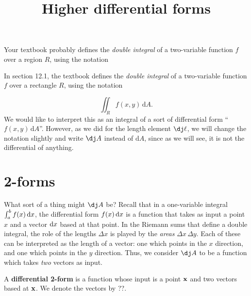 \documentclass[12pt]{amsart}
\title{Higher differential forms}
\begin{document}
\maketitle

\begin{notextbook}
  Your textbook probably defines the \emph{double integral} of a two-variable function $f$ over a region $R$, using the notation
\end{notextbook}
\begin{stewart}
  In section 12.1, the textbook defines the \emph{double integral} of a two-variable function $f$ over a rectangle $R$, using the notation
\end{stewart}
\[ \iint_R f(x,y) \,\mathrm{d}A. \]
We would like to interpret this as an integral of a sort of differential form ``$f(x,y) \,\mathrm{d}A$''.
However, as we did for the length element $\dl$, we will change the notation slightly and write $\dA$ instead of $\mathrm{d}A$, since as we will see, it is not the differential of anything.

\section{2-forms}
\label{sec:2-forms}

What sort of a thing might $\dA$ be?
Recall that in a one-variable integral $\int_a^b f(x)\,{\mathrm{d} x}$, the differential form $f(x)\,{\mathrm{d} x}$ is a function that takes as input a point $x$ and a vector ${\mathrm{d} x}$ based at that point.
In the Riemann sums that define a double integral, the role of the lengths $\Delta x$ is played by the \emph{areas} $\Delta x \,\Delta y$.
Each of these can be interpreted as the length of a vector: one which points in the $x$ direction, and one which points in the $y$ direction.
Thus, we consider $\dA$ to be a function which takes \emph{two} vectors as input.

\begin{defn}
  A \textbf{differential 2-form} is a function whose input is a point $\mathbf{x}$ and two vectors based at $\mathbf{x}$.
  We denote the vectors by ??.
\end{defn}
\end{document}

